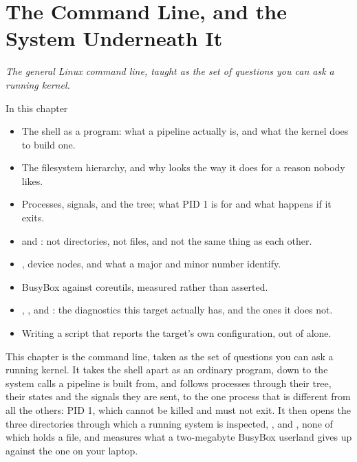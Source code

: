 
\chapter{The Command Line, and the System Underneath It}
\label{c2:ch}

{\large\itshape The general Linux command line, taught as the set of questions you can ask a running
kernel.\par}

\begin{chapterbox}{In this chapter}
\begin{itemize}
  \item The shell as a program: what a pipeline actually is, and what the kernel does to build one.
  \item The filesystem hierarchy, and why  looks the way it does for a reason nobody
    likes.
  \item Processes, signals, and the tree; what PID 1 is for and what happens if it exits.
  \item {} and : not directories, not files, and not the same thing as each
    other.
  \item {}, device nodes, and what a major and minor number identify.
  \item BusyBox against coreutils, measured rather than asserted.
  \item {}, ,  and : the diagnostics this target actually
    has, and the ones it does not.
  \item Writing a script that reports the target's own configuration, out of  alone.
\end{itemize}
\end{chapterbox}

This chapter is the command line, taken as the set of questions you can ask a running kernel. It
takes the shell apart as an ordinary program, down to the system calls a pipeline is built from,
and follows processes through their tree, their states and the signals they are sent, to the one
process that is different from all the others: PID 1, which cannot be killed and must not exit. It
then opens the three directories through which a running system is inspected, ,
 and , none of which holds a file, and measures what a two-megabyte BusyBox
userland gives up against the one on your laptop.

